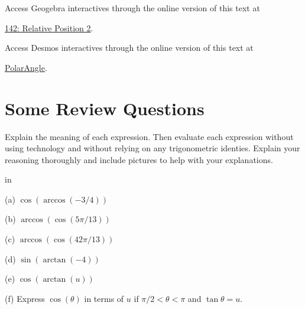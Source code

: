 \documentclass{ximera}
\newcommand{\pskip}{\vskip 0.1 in}
\begin{document}
\begin{example}
\begin{explanation}
\begin{exploration}
Access Geogebra interactives through the online version of this text at
 
\href{https://www.geogebra.org/classic/da2q3jgv}{142: Relative Position 2}.
\end{exploration}

\end{explanation}

\end{example}


\begin{question} \label{Qetfg8uijjg}


 \begin{exploration}
\begin{onlineOnly}
    \begin{center}
\end{center}
\end{onlineOnly}


Access Desmos interactives through the online version of this text at
 
\href{https://www.desmos.com/calculator/balmyutbjj}{PolarAngle}.

\end{exploration}

\end{question}





\section{Some Review Questions}

\begin{question}   \label{Q17:InverseTrig}
Explain the meaning of each expression. Then evaluate each expression without using technology and without relying on any trigonometric identies. Explain your reasoning thoroughly and include pictures to help with your explanations.

\pskip

(a) $\cos (\arccos(-3/4))$ 

(b) $\arccos(\cos (5\pi/13))$

(c) $\arccos(\cos (42\pi/13))$

(d) $\sin(\arctan (-4))$

(e) $\cos(\arctan (u))$

(f) Express $\cos (\theta)$ in terms of $u$  if $\pi/2 < \theta < \pi$ and $\tan \theta=u$.

\end{question} 
\end{document}
